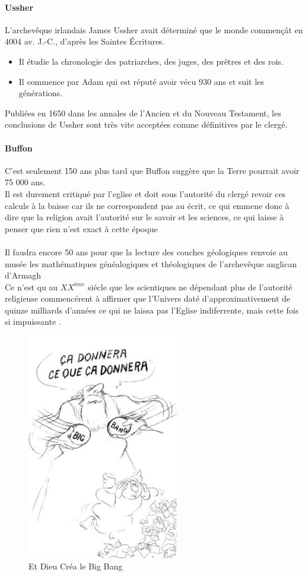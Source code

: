 \paragraph{Ussher}
L'archevêque irlandais James Ussher avait déterminé que le monde commençât en
4004 av. J.-C., d'après les Saintes Écritures. 

\begin{itemize}
\item Il étudie la chronologie des patriarches, des juges, des prêtres et des 
	rois. 
\item Il commence par Adam qui est réputé avoir vécu 930 ans et suit les 
	générations. 
\end{itemize}

Publiées en 1650 dans les annales de l'Ancien et du Nouveau Testament, 
les conclusions de Ussher sont très vite acceptées comme définitives par
le clergé.

\paragraph{Buffon}
C'est seulement 150 ans plus tard que Buffon suggère que la Terre pourrait 
avoir 75 000 ans. \\
Il est durement critiqué par l'eglise et doit sous l'autorité du clergé revoir 
ces calculs à la baisse car ils ne correspondent pas au écrit, ce qui emmene 
donc à dire que la religion avait l'autorité sur le savoir et les sciences,
 ce qui laisse à penser que rien n'est exact à cette époque

\paragraph{}
Il faudra encore 50 ans pour que la lecture des couches géologiques renvoie au 
musée les mathématiques généalogiques et théologiques de l'archevêque anglican 
d'Armagh\\
Ce n'est qu au $XX^{éme}$ siécle que les scientiques ne dépendant plus de l'autorité
religieuse commencérent à affirmer que l'Univers daté d'approximativement de 
quinze milliards d'années ce qui ne laissa pas l'Eglise indiferrente, mais
cette fois si impuissante .

	\begin{figure}[h]
		\begin{center}
	\includegraphics[width=250px]{img6.png}
	\caption{Et Dieu Créa le Big Bang}
		\end{center}
	\end{figure}

